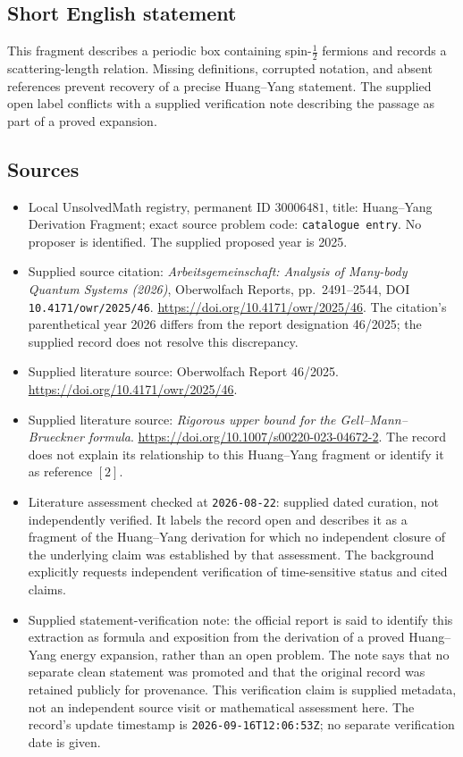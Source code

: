 \documentclass[11pt]{article}
\begin{document}
\subsection{Short English statement}
This fragment describes a periodic box containing spin-\(\tfrac12\) fermions and records a scattering-length relation. Missing definitions, corrupted notation, and absent references prevent recovery of a precise Huang--Yang statement. The supplied open label conflicts with a supplied verification note describing the passage as part of a proved expansion.
\subsection{Sources}
\begin{itemize}
\item Local UnsolvedMath registry, permanent ID \(30006481\), title: Huang--Yang Derivation Fragment; exact source problem code: \texttt{catalogue entry}. No proposer is identified. The supplied proposed year is 2025.
\item Supplied source citation: \emph{Arbeitsgemeinschaft: Analysis of Many-body Quantum Systems (2026)}, Oberwolfach Reports, pp.~2491--2544, DOI \texttt{10.4171/owr/2025/46}. \url{https://doi.org/10.4171/owr/2025/46}. The citation's parenthetical year 2026 differs from the report designation 46/2025; the supplied record does not resolve this discrepancy.
\item Supplied literature source: Oberwolfach Report 46/2025. \url{https://doi.org/10.4171/owr/2025/46}.
\item Supplied literature source: \emph{Rigorous upper bound for the Gell--Mann--Brueckner formula}. \url{https://doi.org/10.1007/s00220-023-04672-2}. The record does not explain its relationship to this Huang--Yang fragment or identify it as reference \([2]\).
\item Literature assessment checked at \texttt{2026-08-22}: supplied dated curation, not independently verified. It labels the record open and describes it as a fragment of the Huang--Yang derivation for which no independent closure of the underlying claim was established by that assessment. The background explicitly requests independent verification of time-sensitive status and cited claims.
\item Supplied statement-verification note: the official report is said to identify this extraction as formula and exposition from the derivation of a proved Huang--Yang energy expansion, rather than an open problem. The note says that no separate clean statement was promoted and that the original record was retained publicly for provenance. This verification claim is supplied metadata, not an independent source visit or mathematical assessment here. The record's update timestamp is \texttt{2026-09-16T12:06:53Z}; no separate verification date is given.
\end{itemize}
\end{document}
